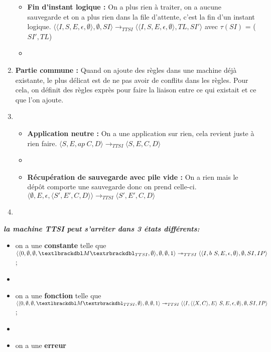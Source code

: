 \documentclass[10pt,a4paper]{report}
\begin{document}
\begin{enumerate}
\begin{itemize}
  \item[] \textbf{Fin d'instant logique :} On a plus rien à traiter, on a aucune sauvegarde et on a plus rien dans la file d'attente, c'est la fin d'un instant logique.
    \smallbreak
    $\langle\langle I,S,E,\epsilon,\emptyset \rangle ,\emptyset,SI\rangle 
    \longrightarrow_{TTSI} 
    \langle\langle I,S,E,\epsilon,\emptyset\rangle,TL,SI'\rangle$
    avec $\tau(SI)$ = ($SI',TL$) 
  \item[]
    
  \end{itemize}
\item[] \textbf{Partie commune :} Quand on ajoute des règles dans une machine déjà existante, le plus délicat est de ne pas avoir de conflits dans les règles. Pour cela, on définit des règles exprès pour faire la liaison entre ce qui existait et ce que l'on ajoute. 
\item[]
  \begin{itemize}
  \item[] \textbf{Application neutre :} On a une application sur rien, cela revient juste à rien faire.
    \smallbreak 
    $\langle S,E,ap~C,D\rangle
    \longrightarrow_{TTSI} 
    \langle S,E,C,D\rangle$
  \item[]
  \item[] \textbf{Récupération de sauvegarde avec pile vide :}  On a rien mais le dépôt comporte une sauvegarde donc on prend celle-ci.
    \smallbreak  
    $\langle \emptyset,E,\epsilon,\langle S',E',C,D\rangle\rangle
    \longrightarrow_{TTSI} 
    \langle S',E',C,D\rangle$
  \end{itemize}
  
\item[]
\end{enumerate}
\bigbreak
\bigbreak


\textbf{\textit{la machine TTSI peut s'arrêter dans 3 états différents:}}
\smallbreak
\begin{itemize}
\item[] on a une \textbf{constante} telle que 
  $\langle\langle 0,\emptyset,\emptyset,\textlbrackdbl M\textrbrackdbl_{TTSI},\emptyset\rangle,\emptyset,\emptyset,1\rangle 
  \twoheadrightarrow_{TTSI} 
  \langle\langle I,b~S,E,\epsilon,\emptyset\rangle,\emptyset,SI,IP\rangle$;
\item[] 
\item[] on a une \textbf{fonction} telle que
  $\langle\langle 0,\emptyset,\emptyset,\textlbrackdbl M\textrbrackdbl_{TTSI},\emptyset\rangle,\emptyset,\emptyset,1\rangle 
  \twoheadrightarrow_{TTSI} 
  \langle\langle I,\langle\langle X,C\rangle,E\rangle~S,E,\epsilon,\emptyset\rangle,\emptyset,SI,IP\rangle$;
\item[] 
\item[] on a une \textbf{erreur} 
\end{itemize}
\end{document}
